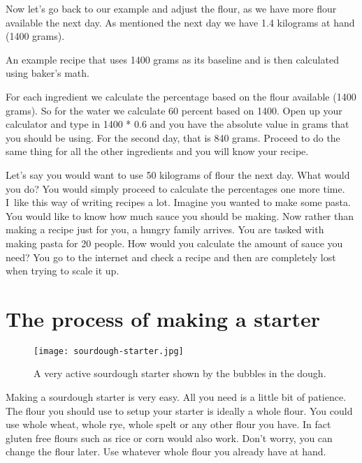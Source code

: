 Now let's go back to our example and adjust the flour, as we have
more flour available the next day. As mentioned the next day
we have 1.4 kilograms at hand (1400 grams).

\begin{table}[!htb]
    \begin{center}
        
        \caption{An example recipe that uses 1400 grams as its baseline and
        is then calculated using baker's math.}
    \end{center}
\end{table}

For each ingredient we calculate the percentage
based on the flour available (1400 grams). So for the water
we calculate 60 percent based on 1400. Open up your
calculator and type in 1400 * 0.6 and you have
the absolute value in grams that you should be using.
For the second day, that is 840 grams. Proceed to do the same
thing for all the other ingredients and you will know
your recipe.


Let's say you would want to use 50 kilograms of flour
the next day. What would you do? You would simply proceed
to calculate the percentages one more time. I~like this
way of writing recipes a lot. Imagine you wanted to make
some pasta. You would like to know how much sauce you should
be making. Now rather than making a recipe just for you, a
hungry family arrives. You are tasked with making pasta
for 20 people. How would you calculate the amount of sauce
you need? You go to the internet and check a recipe and then
are completely lost when trying to scale it up.

\section{The process of making a starter}

\begin{figure}[!htb]
  \texttt{[image: sourdough-starter.jpg]}
  \caption{A very active sourdough starter shown by the bubbles in the dough.}%
  \label{fig:sourdough-starter}
\end{figure}

Making a sourdough starter is very easy. All you need
is a little bit of patience. The flour you should
use to setup your starter is ideally a whole flour.
You could use whole wheat, whole rye, whole spelt or
any other flour you have. In fact gluten free flours such
as rice or corn would also work. Don't worry, you can
change the flour later. Use whatever whole flour you
already have at hand.

